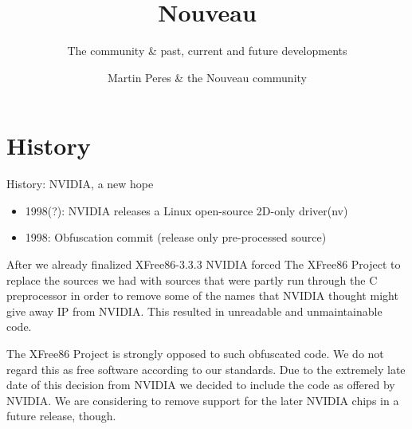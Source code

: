 \documentclass[11pt,english,compress]{beamer}
\title{Nouveau}
\subtitle{The community \& past, current and future developments}
\author{Martin Peres \& the Nouveau community}
\institute{Ph.D. student at LaBRI}
\begin{document}

\begin{frame}
	\titlepage
\end{frame}

\section{History}
	\begin{frame}
		\begin{block}{History: NVIDIA, a new hope}
			\begin{itemize}
				\item 1998(?): NVIDIA releases a Linux open-source 2D-only driver(nv)
				\item 1998: Obfuscation commit (release only pre-processed source)
			\end{itemize}
		\end{block}
	\end{frame}

	\begin{frame}
		\begin{block}{}
			After we already finalized XFree86-3.3.3 NVIDIA forced The XFree86 Project
			to replace the sources we had with sources that were partly run through the
			C preprocessor in order to remove some of the names that NVIDIA thought
			might give away IP from NVIDIA. This resulted in unreadable and unmaintainable
			code.
		\end{block}

		\begin{block}{}
			The XFree86 Project is strongly opposed to such obfuscated code. We do not
			regard this as free software according to our standards. Due to the extremely
			late date of this decision from NVIDIA we decided to include the code as
			offered by NVIDIA. We are considering to remove support for the later NVIDIA
			chips in a future release, though.
		\end{block}
	\end{frame}
\end{document}
